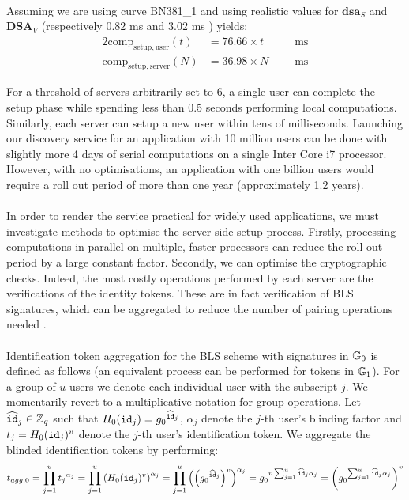 	\paragraph{} Assuming we are using curve BN381\_1 and using realistic values for $\mathbf{dsa}_S$ and $\mathbf{DSA}_V$ (respectively $0.82$ ms and $3.02$ ms \cite{WolfSSl}) yields:
	\begin{alignat}{2}
		\mathrm{comp}_{\mathrm{setup, user}}(t) &= 76.66 \times t  \qquad &\mathrm{ms} \\
		\mathrm{comp}_{\mathrm{setup, server}}(N) &= 36.98\times N &\mathrm{ms}
	\end{alignat}
	
	\noindent For a threshold of servers arbitrarily set to $6$, a single user can complete the setup phase while spending less than 0.5 seconds performing local computations. Similarly, each server can setup a new user within tens of milliseconds. Launching our discovery service for an application with 10 million users can be done with slightly more 4 days of serial computations on a single Inter Core i7 processor. However, with no optimisations, an application with one billion users would require a roll out period of more than one year (approximately 1.2 years).
	
	\paragraph{} In order to render the service practical for widely used applications, we must investigate methods to optimise the server-side setup process. Firstly, processing computations in parallel on multiple, faster processors can reduce the roll out period by a large constant factor. Secondly, we can optimise the cryptographic checks. Indeed, the most costly operations performed by each server are the verifications of the identity tokens. These are in fact verification of BLS signatures, which can be aggregated to reduce the number of pairing operations needed \cite{BLSagg}. 
	
	\paragraph{} Identification token aggregation for the BLS scheme with signatures in $\mathbb{G}_0$ is defined as follows (an equivalent process can be performed for tokens in $\mathbb{G}_1$). For a group of $u$ users  we denote each individual user with the subscript $j$. We momentarily revert to a multiplicative notation for group operations. Let $\widehat {\mathtt{id}}_j \in \mathbb{Z}_q$ such that $H_0(\mathtt{id}_j) = {g_0}^{\widehat{\mathtt{id}}_j}$, $\alpha_j$ denote the $j$-th user's blinding factor and $t_j = H_0(\mathtt{id}_j)^v$ denote the $j$-th user's identification token. We aggregate the blinded identification tokens by performing:
	\begin{equation}
		t_{agg,0} = \prod_{j=1}^{u} {t_j}^{\alpha_j} = \prod_{j=1}^{u} \left(H_0(\mathtt{id}_j)^v\right)^{\alpha_j} =  \prod_{j=1}^{u} \left(\left({g_0}^{\widehat{\mathtt{id}}_j}\right)^v\right)^{\alpha_j} = {g_0}^{v\sum_{j = 1}^u \widehat{\mathtt{id}}_j{\alpha_j}} = \left({g_0}^{\sum_{j = 1}^u \widehat{\mathtt{id}}_j{\alpha_j}}\right)^v
	\end{equation}
	
